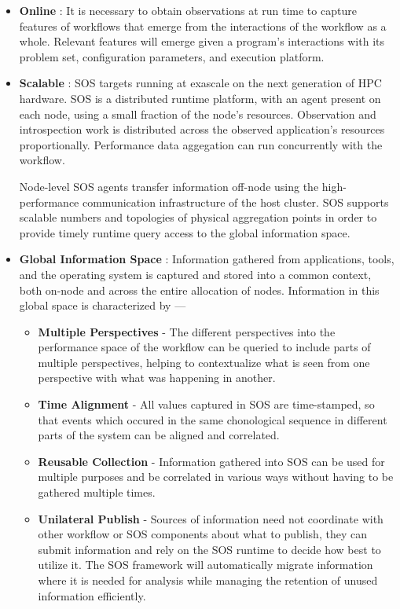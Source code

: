 \begin{itemize}
\item \textbf{Online} : It is necessary to obtain observations at run
  time to capture features of workflows that emerge from the
  interactions of the workflow as a whole.
  Relevant features will emerge given a program's interactions with
  its problem set, configuration parameters, and execution platform.
%
\item \textbf{Scalable} : SOS targets running at exascale on the next
  generation of HPC hardware.
%
SOS is a distributed runtime platform, with an agent present on each
node, using a small fraction of the node's resources.
%
Observation and introspection work is distributed across
the observed application's resources proportionally.
%
Performance data aggegation can run concurrently with the workflow.
%
\par
%
Node-level SOS agents transfer information off-node using the
high-performance communication infrastructure of the host cluster.
%
SOS supports scalable numbers and topologies of physical aggregation
points in order to provide timely runtime query access to the global
information space.
%
\item \textbf{Global Information Space} : Information gathered from
  applications, tools, and the operating system is captured and stored
  into a common context, both on-node and across the entire allocation
  of nodes.  Information in this global space is characterized by ---
%
     \begin{itemize}
        \item \textbf{Multiple Perspectives} - The different
          perspectives into the performance space of the workflow can
          be queried to include parts of multiple
          perspectives, helping to contextualize what is seen from one
          perspective with what was happening in another.
        \item \textbf{Time Alignment} - All values captured in SOS
          are time-stamped, so that events which occured in the same
          chonological sequence in different parts of the system can be
          aligned and correlated.
        \item \textbf{Reusable Collection} - Information gathered into
          SOS can be used for multiple purposes and be correlated
          in various ways without having to be gathered multiple
          times.
        \item \textbf{Unilateral Publish} - Sources of information
          need not coordinate with other workflow or SOS
          components about what to publish, they can submit
          information and rely on the SOS runtime to decide
          how best to utilize it.
          The SOS framework will automatically migrate
          information where it is needed for analysis while managing
          the retention of unused information efficiently.
     \end{itemize}
\end{itemize}

